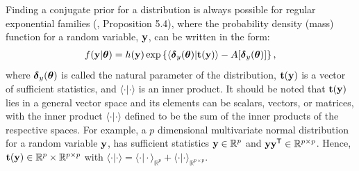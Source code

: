 \documentclass[]{article}
\newcommand{\Real}{\mathbb{R}}
\newcommand{\Tra}{^{\sf T}} %
\newcommand{\V}[1]{{\bm{\mathbf{\MakeLowercase{#1}}}}} %
\def\t{{\bf t}}
\def\y{{\bf y}}
\def \vdelta{{\V{\delta}}}
\def \vtheta{{\V{\theta}}}
\begin{document}
Finding a conjugate prior for a distribution is always possible for regular
exponential families (\citet{bernardo2000}, Proposition 5.4), where the
probability density (mass) function for a random variable, $\y$, can be written
in the form: 
\begin{align} \label{eq:vir:exp-fam}
	f(\y | \vtheta) = h(\y) \exp \left\{ 
		\langle \vdelta_y(\vtheta) | \t(\y) \rangle - 
		A[\vdelta_y(\vtheta)]
	\right\},
\end{align}
where $\vdelta_y(\vtheta)$ is called the natural parameter of the distribution,
$\t(\y)$ is a vector of sufficient statistics, and $\langle \cdot | \cdot
\rangle$ is an inner product. It should be noted that $\t(\y)$ lies in a general
vector space and its elements can be scalars, vectors, or matrices, with the
inner product $\langle \cdot | \cdot \rangle$ defined to be the sum of the inner
products of the respective spaces. For example, a $p$ dimensional multivariate
normal distribution for a random variable $\y$, has sufficient statistics $\y
\in \Real^p$ and $\y\y\Tra \in \Real^{p \times p}$. Hence, $\t(\y) \in
\mathbb{R}^p \times \Real^{p \times p}$ with $\langle \cdot | \cdot \rangle =
\langle \cdot | \cdot \rangle_{\Real^p} + \langle \cdot | \cdot
\rangle_{\Real^{p \times p}}$.  
\end{document}
